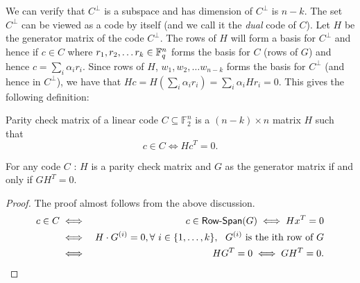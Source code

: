 We can verify that $C^\perp$ is a subspace and has dimension of $C^\perp$ is $n-k$. The set $C^\perp$ can be viewed as a code by itself (and we call it the {\em dual} code of $C$). Let $H$ be the generator matrix of the code $C^\perp$. The rows of $H$ will form a basis for $C^\perp$ and hence if $c \in C$ where $r_1, r_2, \ldots r_k \in {\mathbb{F}}_q^n$ forms the basis for $C$ (rows of $G$) and hence $c = \sum_i \alpha_i r_i$. Since rows of $H$, $w_1, w_2, \ldots w_{n-k}$ forms the basis for $C^\perp$ (and hence in $C^\perp$), we have that $Hc = H\left(\sum_i \alpha_i r_i\right) = \sum_i \alpha_i Hr_i = 0$. This gives the following definition:

\begin{definition}
Parity check matrix of a linear code $C\subseteq {\mathbb F}_{2}^n$ is a $(n-k)\times n$ matrix $H$ such that
\[ c \in C \iff Hc^T =0.\]
\end{definition}
 \begin{lemma}
\label{lem:paritycheck}
For any code $C$ : 
$H$ is a parity check matrix and $G$ as the generator matrix if and only if $GH^T =0$.
\end{lemma}
\begin{proof} The proof almost follows from the above discussion.
\begin{eqnarray*}
c \in C &\iff& c \in \textrm{\sf Row-Span}(G)\iff Hx^T=0\\ & \iff& H\cdot G^{(i)}=0, \forall~i\in\{1,\ldots, k\},~~ G^{(i)} {\mbox { is the ith row of }} G\\ &
	\iff& HG^T=0 \iff GH^T=0.
	\end{eqnarray*} 
\end{proof}

